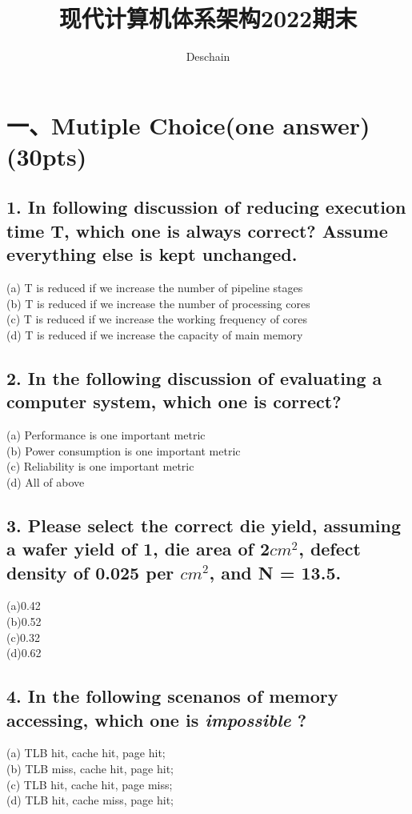 \documentclass[UTF8]{ctexart}
\title{现代计算机体系架构2022期末}
\author{Deschain}
\begin{document}
\maketitle
\section*{一、Mutiple Choice(one answer)(30pts)}
\subsection*{1. In following discussion of reducing execution time T, which one is {\bfseries always correct}? Assume everything else is kept unchanged.}
(a) T is reduced if we increase the number of pipeline stages\\
(b) T is reduced if we increase the number of processing cores\\
(c) T is reduced if we increase the working frequency of cores\\
(d) T is reduced if we increase the capacity of main memory\\
\subsection*{2. In the following discussion of evaluating a computer system, which one is correct?}
(a) Performance is one important metric\\
(b) Power consumption is one important metric\\
(c) Reliability is one important metric\\
(d) All of above\\
\subsection*{3. Please select the correct die yield, assuming a wafer yield of 1, die area of 2$cm^2$, defect density of 0.025 per $cm^2$, and N = 13.5.}
(a)0.42\\
(b)0.52\\
(c)0.32\\
(d)0.62\\
\subsection*{4. In the following scenanos of memory accessing, which one is {\bfseries\textit {impossible} } ?}
(a) TLB hit, cache hit, page hit;\\
(b) TLB miss, cache hit, page hit;\\
(c) TLB hit, cache hit, page miss;\\
(d) TLB hit, cache miss, page hit;\\
\end{document}
